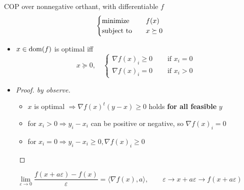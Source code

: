 \begin{remark}
    COP over nonnegative orthant, with differentiable $f$\[\begin{cases}
        \operatorname{minimize} \quad &f(x) \\
        \operatorname{subject\ to} \quad & x \succeq 0
    \end{cases}\]
    \begin{itemize}
        \item $x \in \operatorname{dom}(f)$ is optimal iff \[x \succeq 0,\quad \begin{cases}
            \nabla f(x)_i \ge 0 \quad &\text{ if } x_i = 0\\
            \nabla f(x)_{i} = 0 \quad &\text{ if } x_i > 0
        \end{cases}\]
        \item \begin{proof}[Proof. by observe]\text{}
            \begin{itemize}
                \item $x$ is optimal $\Longrightarrow \nabla f(x)^t(y - x) \ge 0$ holds \textbf{for all feasible} $y$
                \item for $x_i > 0 \Longrightarrow y_i - x_i$ can be positive or negative, so $\nabla f(x)_i = 0$
                \item for $x_i = 0 \Longrightarrow y_i - x_i \ge 0, \nabla f(x)_i \ge 0$
            \end{itemize}
        \end{proof}
    \end{itemize}
\end{remark}

\begin{remark}
    \[\lim_{\varepsilon \to 0}\frac{f(x + a\varepsilon) - f(x)}{\varepsilon} = \langle\nabla f(x), a\rangle, \quad \quad \varepsilon \to x + a\varepsilon \to f(x + a\varepsilon)\]
\end{remark}

